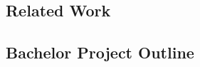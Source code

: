 \subsection{Related Work}
\label{sec:Intro:RelatedWork}




\subsection{Bachelor Project Outline}
\label{sec:Intro:ThesisOutline}








